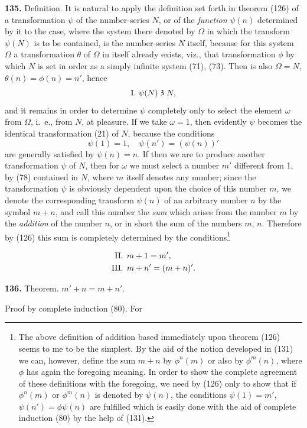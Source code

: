 \documentclass[oneside]{book}
\newcommand\partof{\mathrel{\raisebox{0.45ex}{$\mathfrak{3}$}}}   %
\newcommand\mypara{\medskip\textbf}
\begin{document}
\mypara{135.} Definition. It is natural to apply the definition
set forth in theorem (126) of a transformation $\psi$
of the number-series $N$, or of the \textit{function} $\psi(n)$ determined
by it to the case, where the system there denoted
by $\Omega$ in which the transform $\psi(N)$ is to be contained,
is the number-series $N$ itself, because for this
system $\Omega$ a transformation $\theta$ of $\Omega$ in itself already exists,
viz., that transformation $\phi$ by which $N$ is set in
order as a simply infinite system (71), (73). Then is
also $\Omega=N$, $\theta(n)=\phi(n)=n'$, hence
\[
\mathrm{I.\ }\psi(N) \partof N,
\]
and it remains in order to determine $\psi$ completely
only to select the element $\omega$ from $\Omega$, i.~e., from $N$, at
pleasure. If we take $\omega=1$, then evidently $\psi$ becomes
the identical transformation (21) of $N$, because the
conditions
\[
\psi(1)=1,\quad \psi(n')=(\psi(n))'
\]
are generally satisfied by $\psi(n)=n$. If then we are to
produce another transformation $\psi$ of $N$, then for $\omega$ we
must select a number $m'$ different from 1, by (78) contained
in $N$, where $m$ itself denotes any number; since
the transformation $\psi$ is obviously dependent upon the
choice of this number $m$, we denote the corresponding
transform $\psi(n)$ of an arbitrary number $n$ by the
symbol $m+n$, and call this number the \textit{sum} which
arises from the number $m$ by the \textit{addition} of the number
$n$, or in short the sum of the numbers $m$, $n$.
Therefore by (126) this sum is completely determined
by the conditions\footnote{The above definition of addition based immediately upon theorem (126)
seems to me to be the simplest. By the aid of the notion developed in (131)
we can, however, define the sum $m+n$ by $\phi^n(m)$ or also by $\phi^m(n)$, where $\phi$ has
again the foregoing meaning. In order to show the complete agreement of
these definitions with the foregoing, we need by (126) only to show that if
$\phi^n(m)$ or $\phi^m(n)$ is denoted by $\psi(n)$, the conditions $\psi(1)=m'$, $\psi(n')=\phi\psi(n)$ are
fulfilled which is easily done with the aid of complete induction (80) by the
help of (131).}

\begin{align*}
\text{II\@. }& m+1=m',\\
\text{III\@. }& m+n'=(m+n)'.
\end{align*}

\mypara{136.} Theorem. $m'+n=m+n'$.

Proof by complete induction (80). For
\end{document}

